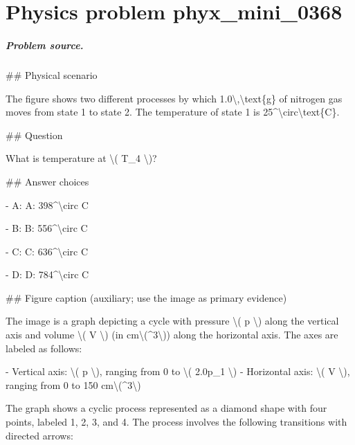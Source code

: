 
\chapter{Physics problem phyx\_mini\_0368}
\label{ch:PhyXMiniProblems_problem_phyx_mini_0368}

\paragraph{Problem source.}
\#\# Physical scenario

The figure shows two different processes by which 1.0\textbackslash{},\textbackslash{}text\{g\} of nitrogen gas moves from state 1 to state 2. The temperature of state 1 is 25\textasciicircum{}\textbackslash{}circ\textbackslash{}text\{C\}.

\#\# Question

What is temperature at \textbackslash{}( T\_4 \textbackslash{})?

\#\# Answer choices

- A: A: 398\textasciicircum{}\textbackslash{}circ C

- B: B: 556\textasciicircum{}\textbackslash{}circ C

- C: C: 636\textasciicircum{}\textbackslash{}circ C

- D: D: 784\textasciicircum{}\textbackslash{}circ C

\#\# Figure caption (auxiliary; use the image as primary evidence)

The image is a graph depicting a cycle with pressure \textbackslash{}( p \textbackslash{}) along the vertical axis and volume \textbackslash{}( V \textbackslash{}) (in cm\textbackslash{}(\textasciicircum{}3\textbackslash{})) along the horizontal axis. The axes are labeled as follows:

- Vertical axis: \textbackslash{}( p \textbackslash{}), ranging from 0 to \textbackslash{}( 2.0p\_1 \textbackslash{})
- Horizontal axis: \textbackslash{}( V \textbackslash{}), ranging from 0 to 150 cm\textbackslash{}(\textasciicircum{}3\textbackslash{})

The graph shows a cyclic process represented as a diamond shape with four points, labeled 1, 2, 3, and 4. The process involves the following transitions with directed arrows:

